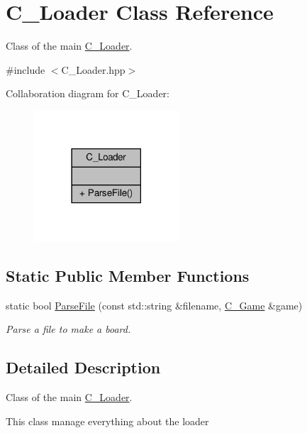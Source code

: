 \hypertarget{classC__Loader}{}\section{C\+\_\+\+Loader Class Reference}
\label{classC__Loader}


Class of the main \hyperlink{classC__Loader}{C\+\_\+\+Loader}.  




{\ttfamily \#include $<$C\+\_\+\+Loader.\+hpp$>$}



Collaboration diagram for C\+\_\+\+Loader\+:\nopagebreak
\begin{figure}[H]
\begin{center}
\leavevmode
\includegraphics[width=153pt]{classC__Loader__coll__graph}
\end{center}
\end{figure}
\subsection*{Static Public Member Functions}
\begin{DoxyCompactItemize}
\item 
static bool \hyperlink{classC__Loader_a7a6f0089933a6108eb92390afe0ead80}{Parse\+File} (const std\+::string \&filename, \hyperlink{classC__Game}{C\+\_\+\+Game} \&game)
\begin{DoxyCompactList}\small\item\em Parse a file to make a board. \end{DoxyCompactList}\end{DoxyCompactItemize}


\subsection{Detailed Description}
Class of the main \hyperlink{classC__Loader}{C\+\_\+\+Loader}. 

This class manage everything about the loader 

